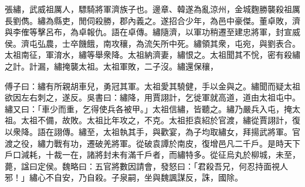 
\begin{pinyinscope}
張繡，武威祖厲人，驃騎將軍濟族子也。邊章、韓遂為亂涼州，金城麴勝襲殺祖厲長劉儁。繡為縣吏，閒伺殺勝，郡內義之。遂招合少年，為邑中豪傑。董卓敗，濟與李傕等擊呂布，為卓報仇。語在卓傳。繡隨濟，以軍功稍遷至建忠將軍，封宣威侯。濟屯弘農，士卒饑餓，南攻穰，為流矢所中死。繡領其衆，屯宛，與劉表合。太祖南征，軍淯水，繡等舉衆降。太祖納濟妻，繡恨之。太祖聞其不恱，密有殺繡之計。計漏，繡掩襲太祖。太祖軍敗，二子沒。繡還保穰，

傅子曰：繡有所親胡車兒，勇冠其軍。太祖愛其驍健，手以金與之。繡聞而疑太祖欲因左右刺之，遂反。吳書曰：繡降，用賈詡計，乞徙軍就高道，道由太祖屯中。繡又曰：「車少而重，乞得使兵各被甲。」太祖信繡，皆聽之。繡乃嚴兵入屯，掩太祖。太祖不備，故敗。太祖比年攻之，不克。太祖拒袁紹於官渡，繡從賈詡計，復以衆降。語在詡傳。繡至，太祖執其手，與歡宴，為子均取繡女，拜揚武將軍。官渡之役，繡力戰有功，遷破羌將軍。從破袁譚於南皮，復增邑凡二千戶。是時天下戶口減耗，十裁一在，諸將封未有滿千戶者，而繡特多。從征烏丸於柳城，未至，薨，諡曰定侯。魏略曰：五官將數因請會，發怒曰：「君殺吾兄，何忍持面視人邪！」繡心不自安，乃自殺。子泉嗣，坐與魏諷謀反，誅，國除。


\end{pinyinscope}
